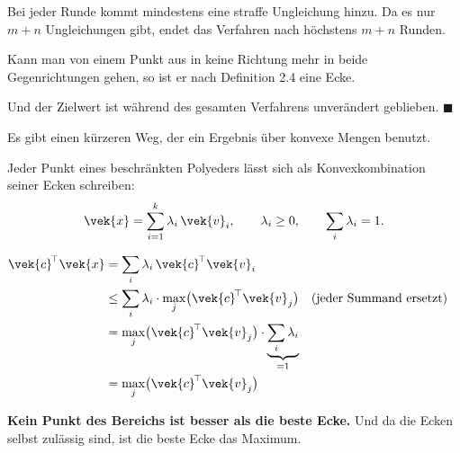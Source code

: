 \begin{merksatz}
Bei jeder Runde kommt mindestens eine straffe Ungleichung hinzu. Da es nur $m+n$ Ungleichungen gibt, endet das Verfahren nach höchstens $m+n$ Runden.

Kann man von einem Punkt aus in keine Richtung mehr in beide Gegenrichtungen gehen, so ist er nach Definition 2.4 eine Ecke.

Und der Zielwert ist während des gesamten Verfahrens unverändert geblieben. $\blacksquare$

\begin{center}
\begin{minipage}{0.88\textwidth}
\end{minipage}
\end{center}
\end{merksatz}

\begin{merksatz}
Es gibt einen kürzeren Weg, der ein Ergebnis über konvexe Mengen benutzt.

Jeder Punkt eines beschränkten Polyeders lässt sich als Konvexkombination seiner Ecken schreiben:
\[ \vek{x} = \sum_{i=1}^{k}\lambda_i\,\vek{v}_i, \qquad \lambda_i \ge 0, \qquad \sum_i\lambda_i = 1 . \]

\begin{align*}
\vek{c}^{\!\top}\vek{x} &= \sum_i \lambda_i\,\vek{c}^{\!\top}\vek{v}_i\\
&\le \sum_i \lambda_i \cdot \max_j\bigl(\vek{c}^{\!\top}\vek{v}_j\bigr) && \text{(jeder Summand ersetzt)}\\
&= \max_j\bigl(\vek{c}^{\!\top}\vek{v}_j\bigr) \cdot \underbrace{\sum_i\lambda_i}_{=1}\\
&= \max_j\bigl(\vek{c}^{\!\top}\vek{v}_j\bigr)
\end{align*}

\begin{center}
\begin{minipage}{0.9\textwidth}
\textbf{Kein Punkt des Bereichs ist besser als die beste Ecke.} Und da die Ecken selbst zulässig sind, ist die beste Ecke das Maximum.
\end{minipage}
\end{center}

\begin{center}
\begin{minipage}{0.88\textwidth}
\end{minipage}
\end{center}
\end{merksatz}

